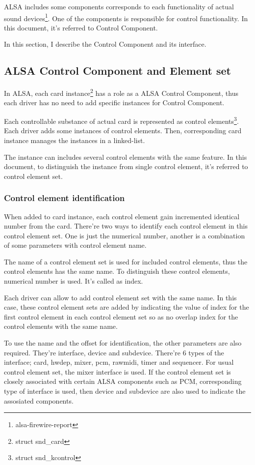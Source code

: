 \documentclass[onecolumn]{article}
\begin{document}
ALSA includes some components corresponds to each functionality of actual sound devices\footnote{alsa-firewire-report}. One of the components is responsible for control functionality. In this document, it's referred to Control Component.

In this section, I describe the Control Component and its interface.


\subsection{ALSA Control Component and Element set}

In ALSA, each card instance\footnote{struct snd\_card} has a role as a ALSA Control Component, thus each driver has no need to add specific instances for Control Component.

Each controllable substance of actual card is represented as control elements\footnote{struct snd\_kcontrol}. Each driver adds some instances of control elements. Then, corresponding card instance manages the instances in a linked-list.

The instance can includes several control elements with the same feature. In this document, to distinguish the instance from single control element, it's referred to control element set.


\subsubsection{Control element identification}

When added to card instance, each control element gain incremented identical number from the card. There're two ways to identify each control element in this control element set. One is just the numerical number, another is a combination of some parameters with control element name.

The name of a control element set is used for included control elements, thus the control elements has the same name. To distinguish these control elements, numerical number is used. It's called as index.

Each driver can allow to add control element set with the same name. In this case, these control element sets are added by indicating the value of index for the first control element in each control element set so as no overlap index for the control elements with the same name.

To use the name and the offset for identification, the other parameters are also required. They're interface, device and subdevice. There're 6 types of the interface; card, hwdep, mixer, pcm, rawmidi, timer and sequencer. For usual control element set, the mixer interface is used. If the control element set is closely associated with certain ALSA components such as PCM, corresponding type of interface is used, then device and subdevice are also used to indicate the assosiated components\cite{alsa-driver}.
\end{document}
